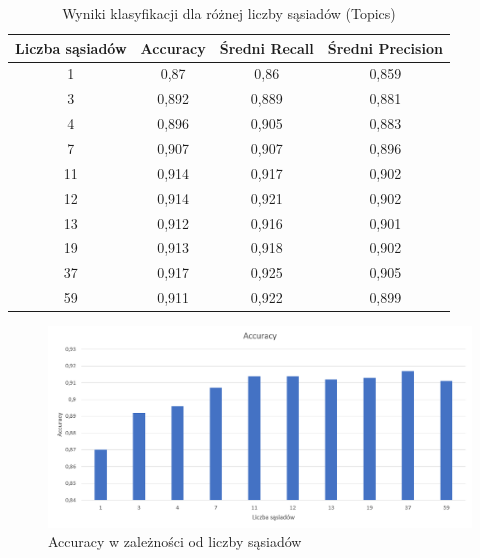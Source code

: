 \documentclass{classrep}
\begin{document}
{\begin{table}[H]
\begin{center}
\caption{Wyniki klasyfikacji dla różnej liczby sąsiadów (Topics)}
\begin{tabular}{|c|c|c|c|}
\hline
\textbf{Liczba sąsiadów} & \textbf{Accuracy} & \textbf{Średni Recall} & \textbf{Średni Precision} \\ \hline
1                        & 0,87              & 0,86                   & 0,859                     \\ \hline
3                        & 0,892             & 0,889                  & 0,881                     \\ \hline
4                        & 0,896             & 0,905                  & 0,883                     \\ \hline
7                        & 0,907             & 0,907                  & 0,896                     \\ \hline
11                       & 0,914             & 0,917                  & 0,902                     \\ \hline
12                       & 0,914             & 0,921                  & 0,902                     \\ \hline
13                       & 0,912             & 0,916                  & 0,901                     \\ \hline
19                       & 0,913             & 0,918                  & 0,902                     \\ \hline
37                       & 0,917             & 0,925                  & 0,905                     \\ \hline
59                       & 0,911             & 0,922                  & 0,899                     \\ \hline
\end{tabular}
\end{center}
\end{table}

\begin{figure}[H]
\caption{Accuracy w zależności od liczby sąsiadów}
\centering
\includegraphics[width=1\textwidth]{i7}
\end{figure}

}
\end{document}
